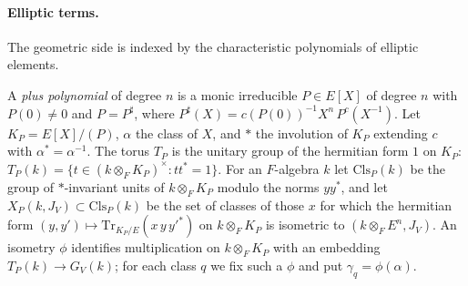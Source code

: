 \paragraph{Elliptic terms.} The geometric side is indexed by the characteristic polynomials of elliptic elements.

\begin{definition}\label{pf:multnc:def-ppol}
A \emph{plus polynomial} of degree $n$ is a monic irreducible $P\in E[X]$ of degree $n$ with $P(0)\ne0$ and
$P=P^\sharp$, where $P^\sharp(X)=c(P(0))^{-1}X^n\,P^c(X^{-1})$. Let $K_P=E[X]/(P)$, $\alpha$ the class of $X$, and $*$
the involution of $K_P$ extending $c$ with $\alpha^*=\alpha^{-1}$. The torus $T_P$ is the unitary group of the hermitian
form $1$ on $K_P$: $T_P(k)=\{t\in(k\otimes_FK_P)^\times:tt^*=1\}$. For an $F$-algebra $k$ let $\mathrm{Cls}_P(k)$ be the
group of $*$-invariant units of $k\otimes_FK_P$ modulo the norms $yy^*$, and let $X_P(k,J_V)\subset\mathrm{Cls}_P(k)$ be the
set of classes of those $x$ for which the hermitian form $(y,y')\mapsto\mathrm{Tr}_{K_P/E}(x\,y\,y'^*)$ on
$k\otimes_FK_P$ is isometric to $(k\otimes_FE^n,J_V)$. An isometry $\phi$ identifies multiplication on $k\otimes_FK_P$
with an embedding $T_P(k)\to G_V(k)$; for each class $q$ we fix such a $\phi$ and put $\gamma_q=\phi(\alpha)$.
\end{definition}

